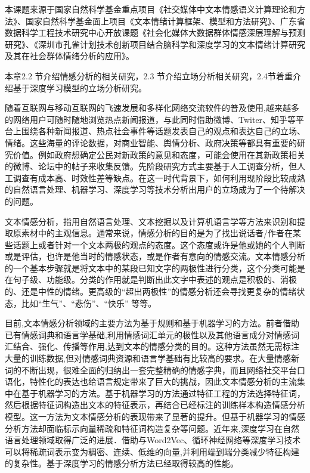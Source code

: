 



本课题来源于国家自然科学基金重点项目《社交媒体中文本情感语义计算理论和方法》、国家自然科学基金面上项目《文本情绪计算框架、模型和方法研究》、广东省数据科学工程技术研究中心开放课题《社会化媒体大数据群体情感深层理解与预测研究》、《深圳市孔雀计划技术创新项目结合脑科学和深度学习的文本情绪计算研究及其在社会群体情绪分析的应用》。

本章2.2 节介绍情感分析的相关研究，2.3 节介绍立场分析相关研究，2.4节着重介绍基于深度学习模型的立场分析研究。



随着互联网与移动互联网的飞速发展和多样化网络交流软件的普及使用,越来越多的网络用户可随时随地浏览热点新闻报道，与此同时借助微博、Twiter、知乎等平台上围绕各种新闻报道、热点社会事件等话题发表自己的观点和表达自己的立场、情绪。这些海量的评论数据，对商业智能、舆情分析、政府决策等都具有重要的研究价值。例如政府想确定公民对新政策的意见和态度，可能会使用在其新政策相关的微博、论坛中的帖子来收集反馈。先阶段研究方式主要基于人工调查分析，但人工调查有成本高、时效性差等缺点。在这一时代背景下，如何利用现阶段比较成熟的自然语言处理、机器学习、深度学习等技术分析出用户的立场成为了一个待解决的问题。

文本情感分析，指用自然语言处理、文本挖掘以及计算机语言学等方法来识别和提取原素材中的主观信息。通常来说，情感分析的目的是为了找出说话者/作者在某些话题上或者针对一个文本两极的观点的态度。这个态度或许是他或她的个人判断或是评估，也许是他当时的情感状态，或是作者有意向的情感交流。文本情感分析的一个基本步骤就是将文本中的某段已知文字的两极性进行分类，这个分类可能是在句子级、功能级。分类的作用就是判断出此文字中表述的观点是积极的、消极的、还是中性的情绪。更高级的“超出两极性”的情感分析还会寻找更复杂的情绪状态，比如“生气”、“悲伤”、“快乐” 等等。

目前,文本情感分析领域的主要方法为基于规则和基于机器学习的方法。前者借助已有情感词典和语言学基础,利用情感词汇单元的极性以及其他语言成分对情感词汇结合、强化、传播等作用,达到文本的情感分类的目的。这种方法虽然无需标注大量的训练数据,但对情感词典资源和语言学基础有比较高的要求。在大量情感新词的不断出现，很难全面的归纳出一套完整精确的情感字典，而且网络社交平台口语化，特性化的表达也给语言规定带来了巨大的挑战，因此文本情感分析的主流集中在基于机器学习的方法。基于机器学习的方法通过特征工程的方法选择特征词，然后根据特征词构造出文本的特征表示，再结合已经标注的训练样本构造情感分析模型。这一方法为文本情感分析的表现带来了显著的提升。但基于机器学习的情感分析方法却面临标示向量稀疏和特征词构造复杂等问题。近年来,深度学习在自然语言处理领域取得广泛的进展．借助与Word2Vec、循环神经网络等深度学习技术可以将稀疏词表示变为稠密、连续、低维的向量,并利用端到端分类减少特征构建的复杂性。基于深度学习的情感分析方法已经取得较高的性能。

